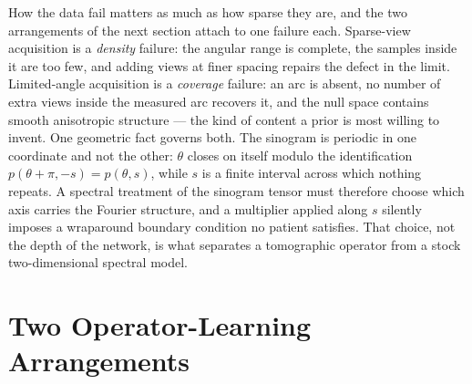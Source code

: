 How the data fail matters as much as how sparse they are, and the two
arrangements of the next section attach to one failure each. Sparse-view
acquisition is a \emph{density} failure: the angular range is complete, the
samples inside it are too few, and adding views at finer spacing repairs the
defect in the limit. Limited-angle acquisition is a \emph{coverage} failure: an
arc is absent, no number of extra views inside the measured arc recovers it, and
the null space contains smooth anisotropic structure --- the kind of content a
prior is most willing to invent. One geometric fact governs both. The sinogram
is periodic in one coordinate and not the other: $\theta$ closes on itself
modulo the identification $p(\theta+\pi,-s) = p(\theta,s)$, while $s$ is a
finite interval across which nothing repeats. A spectral treatment of the
sinogram tensor must therefore choose which axis carries the Fourier structure,
and a multiplier applied along $s$ silently imposes a wraparound boundary
condition no patient satisfies. That choice, not the depth of the network, is
what separates a tomographic operator from a stock two-dimensional spectral
model.

\section{Two Operator-Learning Arrangements}
\label{sec:ch36-operators}

